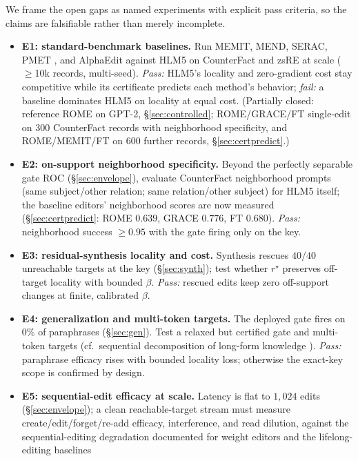 \documentclass[10pt,twocolumn]{article}
\theoremstyle{remark}
\begin{document}
We frame the open gaps as named experiments with explicit pass criteria, so the
claims are falsifiable rather than merely incomplete.

\begin{itemize}
  \item \textbf{E1: standard-benchmark baselines.} Run MEMIT, MEND, SERAC,
  PMET \citep{li2024pmet}, and AlphaEdit \citep{fang2025alphaedit} against HLM5
  on CounterFact and zsRE at scale ($\ge$10k records, multi-seed).
  \emph{Pass:} HLM5's locality and zero-gradient cost stay competitive while its
  certificate predicts each method's behavior; \emph{fail:} a baseline
  dominates HLM5 on locality at equal cost. (Partially closed: reference ROME on
  GPT-2, \S\ref{sec:controlled}; ROME/GRACE/FT single-edit on $300$ CounterFact
  records with neighborhood specificity, and ROME/MEMIT/FT on $600$ further
  records, \S\ref{sec:certpredict}.)
  \item \textbf{E2: on-support neighborhood specificity.} Beyond the perfectly
  separable gate ROC (\S\ref{sec:envelope}), evaluate CounterFact neighborhood
  prompts (same subject/other relation; same relation/other subject) for HLM5
  itself; the baseline editors' neighborhood scores are now measured
  (\S\ref{sec:certpredict}: ROME $0.639$, GRACE $0.776$, FT $0.680$).
  \emph{Pass:} neighborhood success $\ge0.95$ with the gate firing only on the key.
  \item \textbf{E3: residual-synthesis locality and cost.} Synthesis rescues
  $40/40$ unreachable targets at the key (\S\ref{sec:synth}); test whether
  $r^{\star}$ preserves off-target locality with bounded $\beta$. \emph{Pass:}
  rescued edits keep zero off-support changes at finite, calibrated $\beta$.
  \item \textbf{E4: generalization and multi-token targets.} The deployed gate
  fires on $0\%$ of paraphrases (\S\ref{sec:gen}). Test a relaxed but certified gate
  and multi-token targets (cf.\ sequential decomposition of long-form knowledge
  \citep{jiang2025anyedit}). \emph{Pass:} paraphrase efficacy rises with bounded
  locality loss; otherwise the exact-key scope is confirmed by design.
  \item \textbf{E5: sequential-edit efficacy at scale.} Latency is flat to
  $1{,}024$ edits (\S\ref{sec:envelope}); a clean reachable-target stream must
  measure create/edit/forget/re-add efficacy, interference, and read dilution,
  against the sequential-editing degradation documented for weight editors
  \citep{gupta2024forgetting} and the lifelong-editing baselines

\end{itemize}
\end{document}
